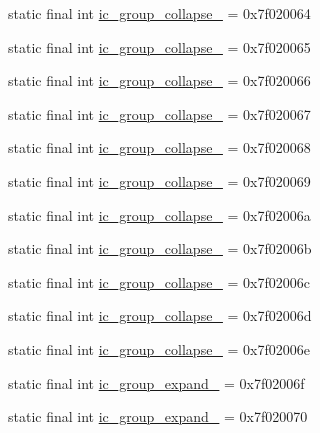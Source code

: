 \begin{CompactItemize}
\item 
static final int \hyperlink{classandroid_1_1support_1_1v7_1_1palette_1_1_r_1_1drawable_ddae683209441effe1eda9729c1d2f08}{ic\_\-group\_\-collapse\_} = 0x7f020064
\item 
static final int \hyperlink{classandroid_1_1support_1_1v7_1_1palette_1_1_r_1_1drawable_544145f1b562029e34427e6c41684dd8}{ic\_\-group\_\-collapse\_} = 0x7f020065
\item 
static final int \hyperlink{classandroid_1_1support_1_1v7_1_1palette_1_1_r_1_1drawable_2b78507228ebd7324271c93026cf3196}{ic\_\-group\_\-collapse\_} = 0x7f020066
\item 
static final int \hyperlink{classandroid_1_1support_1_1v7_1_1palette_1_1_r_1_1drawable_0bfff5dde1948f0f3aff024ed70a98c2}{ic\_\-group\_\-collapse\_} = 0x7f020067
\item 
static final int \hyperlink{classandroid_1_1support_1_1v7_1_1palette_1_1_r_1_1drawable_52f935b29c2e7e08aff4d1fd93864db9}{ic\_\-group\_\-collapse\_} = 0x7f020068
\item 
static final int \hyperlink{classandroid_1_1support_1_1v7_1_1palette_1_1_r_1_1drawable_204f98a0e3d9b5dcec6d3b1bc2b2f05f}{ic\_\-group\_\-collapse\_} = 0x7f020069
\item 
static final int \hyperlink{classandroid_1_1support_1_1v7_1_1palette_1_1_r_1_1drawable_c02db04e3f78bb42abb67e4f667f44c3}{ic\_\-group\_\-collapse\_} = 0x7f02006a
\item 
static final int \hyperlink{classandroid_1_1support_1_1v7_1_1palette_1_1_r_1_1drawable_8851bfb8bd6d2a39feeb375f79fd6a9d}{ic\_\-group\_\-collapse\_} = 0x7f02006b
\item 
static final int \hyperlink{classandroid_1_1support_1_1v7_1_1palette_1_1_r_1_1drawable_dae82d5f5ab6fb777b525c4dd7362ba3}{ic\_\-group\_\-collapse\_} = 0x7f02006c
\item 
static final int \hyperlink{classandroid_1_1support_1_1v7_1_1palette_1_1_r_1_1drawable_d506d364c739a43d42c0aad4c91e19bd}{ic\_\-group\_\-collapse\_} = 0x7f02006d
\item 
static final int \hyperlink{classandroid_1_1support_1_1v7_1_1palette_1_1_r_1_1drawable_418a1de2bc34ebfca3716437277b679a}{ic\_\-group\_\-collapse\_} = 0x7f02006e
\item 
static final int \hyperlink{classandroid_1_1support_1_1v7_1_1palette_1_1_r_1_1drawable_92e57c6ac35d81c77e9be0e8bca12581}{ic\_\-group\_\-expand\_} = 0x7f02006f
\item 
static final int \hyperlink{classandroid_1_1support_1_1v7_1_1palette_1_1_r_1_1drawable_14ce2a19fcef48a8598943784f128cce}{ic\_\-group\_\-expand\_} = 0x7f020070

\end{CompactItemize}
